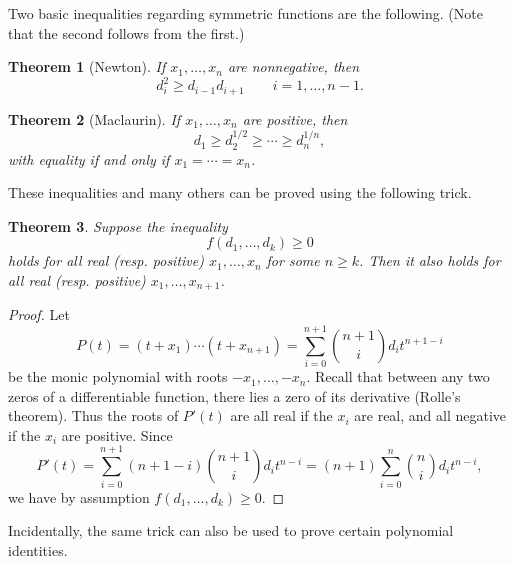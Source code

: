 \documentclass[12pt]{report}
\newtheorem{theorem}{Theorem}
\numberwithin{exc}{section}
\begin{document}
Two basic inequalities regarding symmetric functions are the following. (Note
that the second follows from the first.)
\begin{theorem}[Newton]
If $x_1, \dots, x_n$ are nonnegative, then %
\[
d_i^2 \geq d_{i-1} d_{i+1} \qquad i = 1, \dots, n-1.
\]
\end{theorem}
\begin{theorem}[Maclaurin]
If $x_{1}, \dots, x_{n}$ are positive, then
\[
d_{1} \geq d_{2}^{1/2} \geq \cdots \geq d_{n}^{1/n},
\]
with equality if and only if $x_{1} = \cdots = x_{n}$.
\end{theorem}
These inequalities and many others can be proved using the following trick.
\begin{theorem} \label{trick}
Suppose the inequality
\[
f(d_{1}, \dots, d_{k}) \geq 0
\]
holds for all real (resp. positive) $x_{1}, \dots, x_{n}$ for some 
$n \geq k$. Then it also holds for all real (resp. positive) 
$x_{1}, \dots, x_{n+1}$.
\end{theorem}
\begin{proof}
Let
\[
P(t) = (t + x_{1})\cdots (t+x_{n+1}) = \sum_{i=0}^{n+1} 
\binom{n+1}{i} d_{i} t^{n+1-i}
\]
be the monic polynomial 
with roots $-x_{1}, \dots, -x_{n}$. Recall that between any two zeros 
of a differentiable function, there lies a zero of its derivative 
(Rolle's theorem). Thus the roots of $P'(t)$ are all real if the 
$x_{i}$ are real, and all negative if the $x_{i}$ are positive. Since
\[
P'(t) = \sum_{i=0}^{n+1} (n+1-i) \binom{n+1}{i} d_{i} t^{n-i}
= (n+1) \sum_{i=0}^{n} \binom{n}{i} d_{i} t^{n-i},
\]
we have by assumption $f(d_{1}, \dots, d_{k}) \geq 0$.
\end{proof}
Incidentally, the same trick can 
also be used to prove certain polynomial identities.
\end{document}
